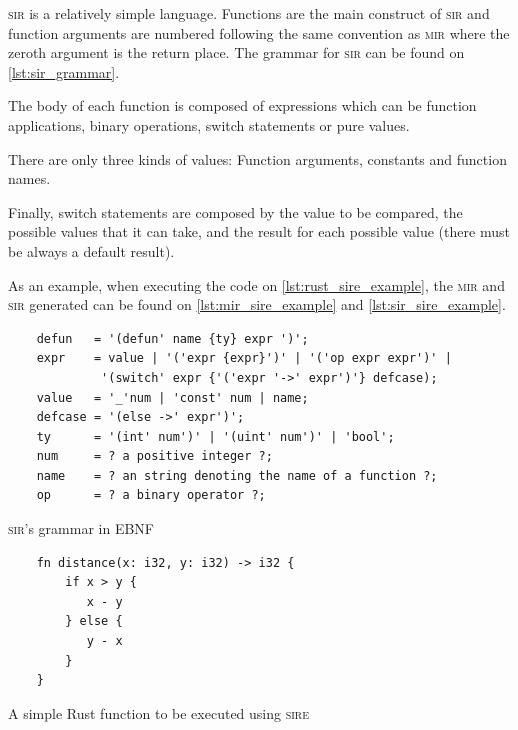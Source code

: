 \textsc{sir} is a relatively simple language. Functions are the main construct
of \textsc{sir} and function arguments are numbered following the same
convention as \textsc{mir} where the zeroth argument is the return place.  The
grammar for \textsc{sir} can be found on \ref{lst:sir_grammar}.

The body of each function is composed of expressions which can be function
applications, binary operations, switch statements or pure values. 

There are only three kinds of values: Function arguments, constants and
function names. 

Finally, switch statements are composed by the value to be compared, the
possible values that it can take, and the result for each possible value (there
must be always a default result). 

 As an example, when executing the code on \ref{lst:rust_sire_example}, the
 \textsc{mir} and \textsc{sir} generated can be found on
 \ref{lst:mir_sire_example} and \ref{lst:sir_sire_example}.

\begin{listing}[ht]
    \begin{verbatim}
    defun   = '(defun' name {ty} expr ')';
    expr    = value | '('expr {expr}')' | '('op expr expr')' | 
             '(switch' expr {'('expr '->' expr')'} defcase);
    value   = '_'num | 'const' num | name;
    defcase = '(else ->' expr')';
    ty      = '(int' num')' | '(uint' num')' | 'bool';
    num     = ? a positive integer ?;
    name    = ? an string denoting the name of a function ?;
    op      = ? a binary operator ?;
    \end{verbatim}
    \caption{\textsc{sir}'s grammar in EBNF}
  \label{lst:sir_grammar}
\end{listing}

\begin{listing}[ht]
    \begin{verbatim}
    fn distance(x: i32, y: i32) -> i32 {
        if x > y {
           x - y
        } else {
           y - x
        }
    }
    \end{verbatim}
    \caption{A simple Rust function to be executed using \textsc{sire}}
  \label{lst:rust_sire_example}
\end{listing}

